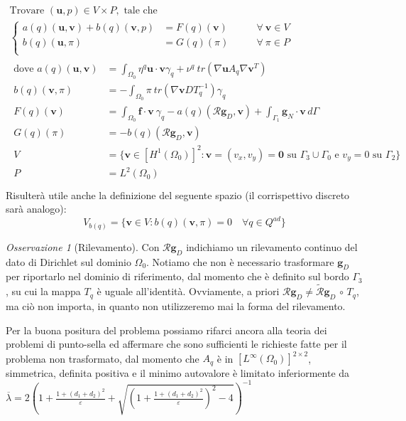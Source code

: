 \documentclass[a4paper,11pt,twoside]{article}
\newcommand{\Q}{Q^{ad}}
\renewcommand{\v}{\mathbf{v}}
\renewcommand{\O}{{\Omega_0}}
\theoremstyle{plain}
\theoremstyle{definition}
\theoremstyle{remark}
\newtheorem{oss}{Osservazione}
\begin{document}
\begin{equation}
\begin{split}
	\text{Trovare }(\mathbf{u},p)\in V\times P, \text{ tale che } \\
	\left\{
	\begin{aligned}
		a(q)(\mathbf{u},\mathbf{v}) + b(q)(\mathbf{v},p) &= F(q)(\mathbf{v})\qquad&\forall\ \mathbf{v}\in  V\\
		b(q)(\mathbf{u},\pi) &= G(q)(\pi)
			\qquad&\forall\ \pi \in P\\
	\end{aligned}\right.\\
	\begin{split}
		\text{dove } a(q)(\mathbf{u},\mathbf{v})&=\int_{\Omega_0}{\eta^q \mathbf{u}\cdot\mathbf{v}\gamma_q+\nu^q\ tr(\nabla \mathbf{u}A_q\nabla\mathbf{v}^T)}\\
		b(q)(\mathbf{v},\pi) &= -\int_{\Omega_0}{\pi\ tr(\nabla\mathbf{v}DT_q^{-1})\gamma_q}\\
		F(q)(\mathbf{v}) &= \int_{\Omega_0}{ \mathbf{f}\cdot \mathbf{v}\ \gamma_q}-a(q)(\mathcal{R}\mathbf{g}_D,\mathbf{v}) + \int_{\Gamma_1}{\mathbf{g}_N\cdot\mathbf{v}\,d\Gamma}\\
		G(q)(\pi)&=-b(q)(\mathcal{R}\mathbf{g}_D,\mathbf{v})\\
		V&=\{\v\in[H^1(\O)]^2\colon \v=(v_x,v_y)=\mathbf 0\text{ su }\Gamma_3\cup\Gamma_0\text{ e }v_y=0\text{ su }\Gamma_2\}\\
		P&=L^2(\O)
	\end{split}\\
\end{split}
\label{eq:StokesdebT}
\end{equation}
Risulterà utile anche la definizione del seguente spazio (il corrispettivo discreto sarà analogo):
$$ V_{b(q)} = \{\v\in V\colon b(q)(\v,\pi) = 0\quad\forall q\in\Q\} $$
\begin{oss}[Rilevamento]
	Con $\mathcal{R}\mathbf g_D$ indichiamo un rilevamento continuo del dato di Dirichlet sul dominio $\O$. Notiamo che non è necessario trasformare $\mathbf g_D$ per riportarlo nel dominio di riferimento, dal momento che è definito sul bordo $\Gamma_3$, su cui la mappa $T_q$ è uguale all'identità. Ovviamente, a priori $\mathcal{R}\mathbf g_D\neq\widetilde{\mathcal{R}}\mathbf g_D\,\circ\,T_q$, ma ciò non importa, in quanto non utilizzeremo mai la forma del rilevamento.
\end{oss}
Per la buona positura del problema possiamo rifarci ancora alla teoria dei problemi di punto-sella ed affermare che sono sufficienti le richieste fatte per il problema non trasformato, dal momento che $A_q$ è in $[L^\infty(\O)]^{2\times2}$, simmetrica, definita positiva e il minimo autovalore è limitato inferiormente da $\overline{\lambda}=2\left(1+\frac{1+(d_1+d_2)^2}{\varepsilon} + \sqrt{\left(1+\frac{1+(d_1+d_2)^2}{\varepsilon}\right)^2-4}\right)^{-1}$
\end{document}
